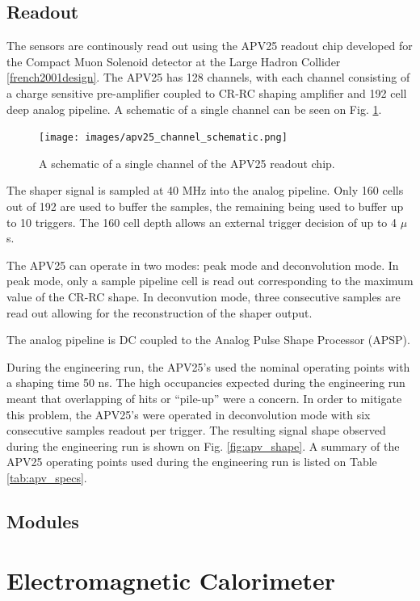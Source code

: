 \subsection*{Readout}

The sensors are continously read out using the APV25 readout chip developed for
the Compact Muon Solenoid detector at the Large Hadron Collider 
\ref{french2001design}. The APV25 has 128 channels, with each channel consisting
of a charge sensitive pre-amplifier coupled to CR-RC shaping amplifier and 192
cell deep analog pipeline.  A schematic of a single channel can be seen on 
Fig. \ref{fig:apv25_schem}.
\begin{figure}
    \centering
    \texttt{[image: images/apv25\_channel\_schematic.png]}
    \caption{A schematic of a single channel of the APV25 readout chip.}
    \label{fig:apv25_schem}
\end{figure}

The shaper signal is sampled at 40 MHz into the analog pipeline.  Only 160 cells
out of 192 are used to buffer the samples, the remaining being used to buffer
up to 10 triggers.  The 160 cell depth allows an external trigger decision of 
up to 4 $\mu$s.    

The APV25 can operate in two modes: peak mode and deconvolution mode.  In peak
mode, only a sample pipeline cell is read out corresponding to the maximum 
value of the CR-RC shape.  In deconvution mode, three consecutive samples are
read out allowing for the reconstruction of the shaper output.

The analog pipeline is DC coupled to the Analog Pulse Shape Processor (APSP).

During the engineering run, the APV25's used the nominal  operating points with
a shaping time 50 ns.  The high occupancies expected during the engineering run
meant that overlapping of hits or ``pile-up'' were a concern.  In order to 
mitigate this problem, the APV25's were operated in deconvolution mode with
six consecutive samples readout per trigger.  The resulting signal shape 
observed during the engineering run is shown on Fig. \ref{fig:apv_shape}.  A 
summary of the APV25 operating points used during the engineering run is listed
on Table \ref{tab:apv_specs}.

\subsection*{Modules}

\section{Electromagnetic Calorimeter}

